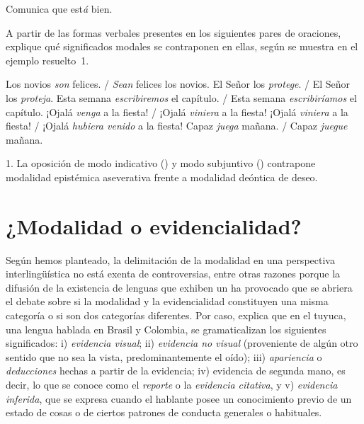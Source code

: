 \begin{exe}
  \ex\label{ex:14-comunica1} Comunica que est\textit{á} bien.
\end{exe}

\begin{ejercicio}\label{ej:14-modos}
A partir de las formas verbales presentes en los siguientes pares de oraciones,
explique qué significados modales se contraponen en ellas, según se muestra en
el ejemplo resuelto~1.

\begin{exe}
  \ex Los novios \textit{son} felices. / \textit{Sean} felices los novios.
  \ex El Señor los \textit{protege}. / El Señor los \textit{proteja}.
  \ex Esta semana \textit{escribiremos} el capítulo. / Esta semana
      \textit{escribiríamos} el capítulo.
  \ex ¡Ojalá \textit{venga} a la fiesta! / ¡Ojalá \textit{viniera} a la fiesta!
  \ex ¡Ojalá \textit{viniera} a la fiesta! / ¡Ojalá \textit{hubiera venido} a la
      fiesta!
  \ex Capaz \textit{juega} mañana. / Capaz \textit{juegue} mañana.
\end{exe}

\begin{resuelto}
1. La oposición de modo indicativo () y modo subjuntivo
() contrapone modalidad epistémica aseverativa frente a modalidad
deóntica de deseo.
\end{resuelto}
\end{ejercicio}

\section{¿Modalidad o evidencialidad?}\label{sec:14-evidencialidad}

Según hemos planteado, la delimitación de la modalidad en una perspectiva
interlingüística no está exenta de controversias, entre otras razones porque la
difusión de la existencia de lenguas que exhiben un  ha provocado que se abriera el debate sobre si la modalidad y la
evidencialidad constituyen una misma categoría o si son dos categorías
diferentes. Por caso, \textcite{barnes1984} explica que en el tuyuca, una lengua
hablada en Brasil y Colombia, se gramaticalizan los siguientes significados: i)
\textit{evidencia visual}; ii) \textit{evidencia no visual} (proveniente de algún
otro sentido que no sea la vista, predominantemente el oído); iii)
\textit{apariencia} o \textit{deducciones} hechas a partir de la evidencia; iv)
evidencia de segunda mano, es decir, lo que se conoce como el \textit{reporte} o
la \textit{evidencia citativa}, y v) \textit{evidencia inferida}, que se expresa
cuando el hablante posee un conocimiento previo de un estado de cosas o de
ciertos patrones de conducta generales o habituales.

